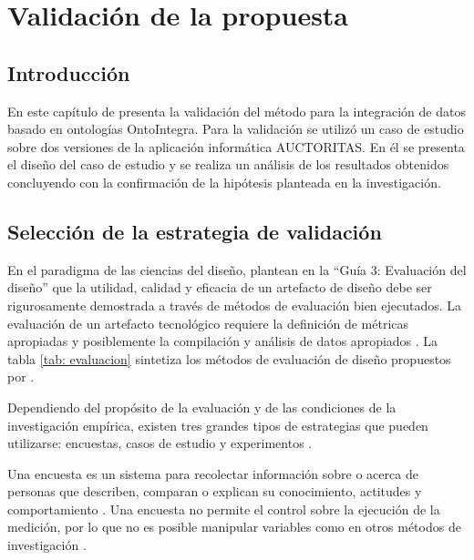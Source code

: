 \chapter{\large Validación de la propuesta}\label{Capítulo 3}

\pagestyle{fancy}
\lhead{}
\chead{}
\lfoot{}
\cfoot{}
\rfoot{\thepage}
\renewcommand{\headrulewidth}{0.4pt}
\vspace{-1cm}

\section{Introducción}
En este capítulo de presenta la validación del método para la integración de datos basado en ontologías OntoIntegra. Para la validación se utilizó un caso de estudio sobre dos versiones de la aplicación informática AUCTORITAS. En él se presenta el diseño del caso de estudio y se realiza un análisis de los resultados obtenidos concluyendo con la confirmación de la hipótesis planteada en la investigación.

\section{Selección de la estrategia de validación}
En el paradigma de las ciencias del diseño, \cite{Hevner:2004:DSI:2017212.2017217} plantean en la ``Guía 3: Evaluación del diseño'' que la utilidad, calidad y eficacia de un artefacto de diseño debe ser rigurosamente demostrada a través de métodos de evaluación bien ejecutados. La evaluación de un artefacto tecnológico requiere la definición de métricas apropiadas y posiblemente la compilación y análisis de datos apropiados \citep{Hevner:2004:DSI:2017212.2017217}. La tabla \ref{tab: evaluacion} sintetiza los métodos de evaluación de diseño propuestos por \cite{Hevner:2004:DSI:2017212.2017217}.

Dependiendo del propósito de la evaluación y de las condiciones de la investigación empírica, existen tres grandes tipos de estrategias que pueden utilizarse: encuestas, casos de estudio y experimentos \citep{Wohlin2012}.

Una encuesta es un sistema para recolectar información sobre o acerca de personas que describen, comparan o explican su conocimiento, actitudes y comportamiento \citep{Wohlin2012}. Una encuesta no permite el control sobre la ejecución de la medición, por lo que no es posible manipular variables como en otros métodos de investigación \citep{Wohlin2012}.


